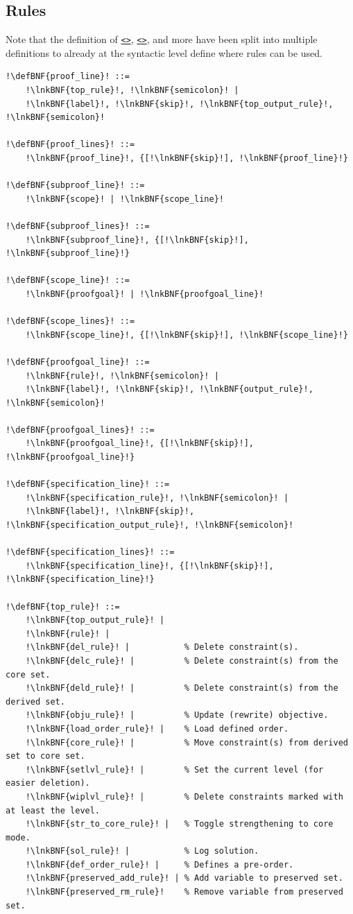 \documentclass[a4paper]{article}
\newcommand{\defBNF}[1]{\hypertarget{def:#1}{<\detokenize{#1}>}}
\newcommand{\lnkBNF}[1]{\hyperlink{def:#1}{<\detokenize{#1}>}}
\begin{document}
\subsection{Rules}\label{sec:rules}
Note that the definition of \texttt{\lnkBNF{proof_line}}, \texttt{\lnkBNF{rule}}, and more have been split into multiple definitions to already at the syntactic level define where rules can be used.
\begin{lstlisting}
!\defBNF{proof_line}! ::=
	!\lnkBNF{top_rule}!, !\lnkBNF{semicolon}! |
	!\lnkBNF{label}!, !\lnkBNF{skip}!, !\lnkBNF{top_output_rule}!, !\lnkBNF{semicolon}!

!\defBNF{proof_lines}! ::=
	!\lnkBNF{proof_line}!, {[!\lnkBNF{skip}!], !\lnkBNF{proof_line}!}

!\defBNF{subproof_line}! ::=
	!\lnkBNF{scope}! | !\lnkBNF{scope_line}!

!\defBNF{subproof_lines}! ::=
	!\lnkBNF{subproof_line}!, {[!\lnkBNF{skip}!], !\lnkBNF{subproof_line}!}

!\defBNF{scope_line}! ::=
	!\lnkBNF{proofgoal}! | !\lnkBNF{proofgoal_line}!

!\defBNF{scope_lines}! ::=
	!\lnkBNF{scope_line}!, {[!\lnkBNF{skip}!], !\lnkBNF{scope_line}!}

!\defBNF{proofgoal_line}! ::=
	!\lnkBNF{rule}!, !\lnkBNF{semicolon}! |
	!\lnkBNF{label}!, !\lnkBNF{skip}!, !\lnkBNF{output_rule}!, !\lnkBNF{semicolon}!

!\defBNF{proofgoal_lines}! ::=
	!\lnkBNF{proofgoal_line}!, {[!\lnkBNF{skip}!], !\lnkBNF{proofgoal_line}!}

!\defBNF{specification_line}! ::=
	!\lnkBNF{specification_rule}!, !\lnkBNF{semicolon}! |
	!\lnkBNF{label}!, !\lnkBNF{skip}!, !\lnkBNF{specification_output_rule}!, !\lnkBNF{semicolon}!

!\defBNF{specification_lines}! ::=
	!\lnkBNF{specification_line}!, {[!\lnkBNF{skip}!], !\lnkBNF{specification_line}!}

!\defBNF{top_rule}! ::=
	!\lnkBNF{top_output_rule}! |
	!\lnkBNF{rule}! |
	!\lnkBNF{del_rule}! |           % Delete constraint(s).
	!\lnkBNF{delc_rule}! |          % Delete constraint(s) from the core set.
	!\lnkBNF{deld_rule}! |          % Delete constraint(s) from the derived set.
	!\lnkBNF{obju_rule}! |          % Update (rewrite) objective.
	!\lnkBNF{load_order_rule}! |    % Load defined order.
	!\lnkBNF{core_rule}! |          % Move constraint(s) from derived set to core set.
	!\lnkBNF{setlvl_rule}! |        % Set the current level (for easier deletion).
	!\lnkBNF{wiplvl_rule}! |        % Delete constraints marked with at least the level.
	!\lnkBNF{str_to_core_rule}! |   % Toggle strengthening to core mode.
	!\lnkBNF{sol_rule}! |           % Log solution.
	!\lnkBNF{def_order_rule}! |     % Defines a pre-order.
	!\lnkBNF{preserved_add_rule}! | % Add variable to preserved set.
	!\lnkBNF{preserved_rm_rule}!    % Remove variable from preserved set.


\end{lstlisting}
\end{document}
